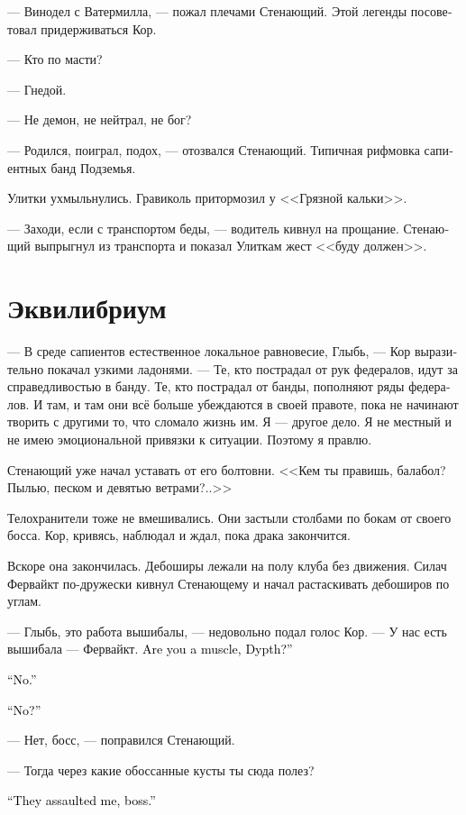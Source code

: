 \documentclass[a4paper,12pt,fleqn]{book}\usepackage{cooltooltips}\usepackage{polyglossia}\setdefaultlanguage[babelshorthands=true]{russian}\setotherlanguage{english}\defaultfontfeatures{Ligatures=TeX,Mapping=tex-text} \usepackage{xcolor}\definecolor{lightgray}{HTML}{bbbbbb}\color{lightgray}\newcommand{\ml}[3]{\textenglish{\textcolor{black}{#3}}}
\newcommand{\asterism}{\vspace{1em}{\centering\Large\bfseries$\ast~\ast~\ast$\par}\vspace{1em}}
\begin{document}
--- Винодел с Ватермилла, --- пожал плечами Стенающий.
Этой легенды посоветовал придерживаться Кор.

--- Кто по масти?

--- Гнедой.

--- Не демон, не нейтрал, не бог?

--- Родился, поиграл, подох, --- отозвался Стенающий.
Типичная рифмовка сапиентных банд Подземья.

Улитки ухмыльнулись.
Гравиколь притормозил у <<Грязной кальки>>.

--- Заходи, если с транспортом беды, --- водитель кивнул на прощание.
Стенающий выпрыгнул из транспорта и показал Улиткам жест <<буду должен>>.

\section{Эквилибриум}

--- В среде сапиентов естественное локальное равновесие, Глыбь, --- Кор выразительно покачал узкими ладонями.
--- Те, кто пострадал от рук федералов, идут за справедливостью в банду.
Те, кто пострадал от банды, пополняют ряды федералов.
И там, и там они всё больше убеждаются в своей правоте, пока не начинают творить с другими то, что сломало жизнь им.
Я --- другое дело.
Я не местный и не имею эмоциональной привязки к ситуации.
Поэтому я правлю.

Стенающий уже начал уставать от его болтовни.
<<Кем ты правишь, балабол?
Пылью, песком и девятью ветрами?..>>

\asterism

Телохранители тоже не вмешивались.
Они застыли столбами по бокам от своего босса.
Кор, кривясь, наблюдал и ждал, пока драка закончится.

Вскоре она закончилась.
Дебоширы лежали на полу клуба без движения.
Силач Фервайкт по-дружески кивнул Стенающему и начал растаскивать дебоширов по углам.

--- Глыбь, это работа вышибалы, --- недовольно подал голос Кор.
--- У нас есть вышибала --- Фервайкт.
\ml{$0$}
{Ты вышибала, Глыбь?}
{Are you a muscle, Dypth?''}

\ml{$0$}
{--- Нет.}
{``No.''}

\ml{$0$}
{--- Нет?}
{``No?''}

--- Нет, босс, --- поправился Стенающий.

--- Тогда через какие обоссанные кусты ты сюда полез?

\ml{$0$}
{--- Они на меня напали, босс.}
{``They assaulted me, boss.''}
\end{document}
